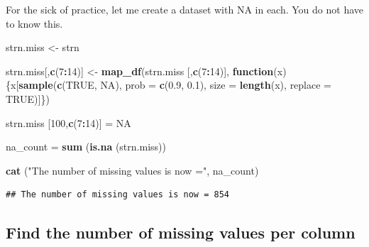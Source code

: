 \documentclass[
]{book}
\newenvironment{Shaded}{\begin{snugshade}}{\end{snugshade}}
\newcommand{\CommentTok}[1]{\textcolor[rgb]{0.56,0.35,0.01}{\textit{#1}}}
\newcommand{\ControlFlowTok}[1]{\textcolor[rgb]{0.13,0.29,0.53}{\textbf{#1}}}
\newcommand{\DataTypeTok}[1]{\textcolor[rgb]{0.13,0.29,0.53}{#1}}
\newcommand{\DecValTok}[1]{\textcolor[rgb]{0.00,0.00,0.81}{#1}}
\newcommand{\FloatTok}[1]{\textcolor[rgb]{0.00,0.00,0.81}{#1}}
\newcommand{\KeywordTok}[1]{\textcolor[rgb]{0.13,0.29,0.53}{\textbf{#1}}}
\newcommand{\NormalTok}[1]{#1}
\newcommand{\OperatorTok}[1]{\textcolor[rgb]{0.81,0.36,0.00}{\textbf{#1}}}
\newcommand{\OtherTok}[1]{\textcolor[rgb]{0.56,0.35,0.01}{#1}}
\newcommand{\StringTok}[1]{\textcolor[rgb]{0.31,0.60,0.02}{#1}}
\begin{document}
For the sick of practice, let me create a dataset with NA in each. You do not have to know this.

\begin{Shaded}
\begin{Highlighting}[]
\NormalTok{strn.miss <-}\StringTok{ }\NormalTok{strn}

\NormalTok{strn.miss[,}\KeywordTok{c}\NormalTok{(}\DecValTok{7}\OperatorTok{:}\DecValTok{14}\NormalTok{)] <-}\StringTok{  }\KeywordTok{map_df}\NormalTok{(strn.miss [,}\KeywordTok{c}\NormalTok{(}\DecValTok{7}\OperatorTok{:}\DecValTok{14}\NormalTok{)],}
                               \ControlFlowTok{function}\NormalTok{(x) \{x[}\KeywordTok{sample}\NormalTok{(}\KeywordTok{c}\NormalTok{(}\OtherTok{TRUE}\NormalTok{, }\OtherTok{NA}\NormalTok{), }
                                                     \DataTypeTok{prob =} \KeywordTok{c}\NormalTok{(}\FloatTok{0.9}\NormalTok{, }\FloatTok{0.1}\NormalTok{), }
                                                     \DataTypeTok{size =} \KeywordTok{length}\NormalTok{(x),}
                                                     \DataTypeTok{replace =} \OtherTok{TRUE}\NormalTok{)]\})}

\NormalTok{strn.miss [}\DecValTok{100}\NormalTok{,}\KeywordTok{c}\NormalTok{(}\DecValTok{7}\OperatorTok{:}\DecValTok{14}\NormalTok{)] =}\StringTok{ }\OtherTok{NA}

\NormalTok{na_count =}\StringTok{ }\KeywordTok{sum}\NormalTok{ (}\KeywordTok{is.na}\NormalTok{ (strn.miss))}

\KeywordTok{cat}\NormalTok{ (}\StringTok{"The number of missing values is now ="}\NormalTok{, na_count)}
\end{Highlighting}
\end{Shaded}

\begin{verbatim}
## The number of missing values is now = 854
\end{verbatim}

\hypertarget{find-the-number-of-missing-values-per-column}{%
\subsection{Find the number of missing values per column}\label{find-the-number-of-missing-values-per-column}}

\begin{Shaded}
\end{Shaded}
\end{document}
